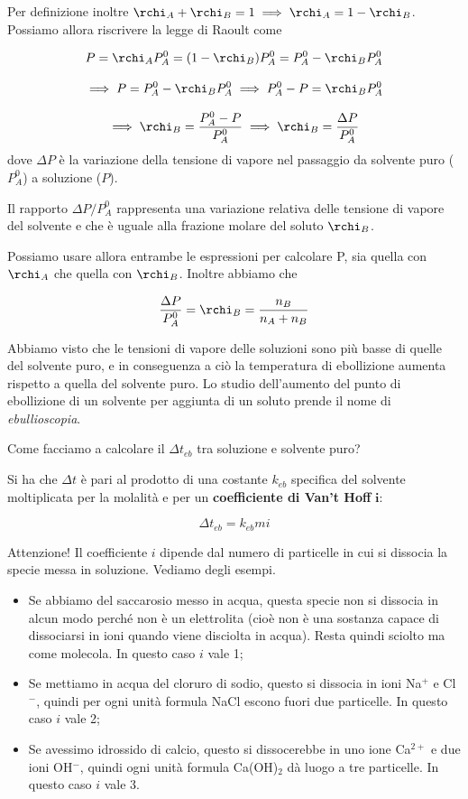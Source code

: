 Per definizione inoltre $\rchi_A + \rchi_B = 1 \implies \rchi_A = 1 - \rchi_B$. Possiamo allora riscrivere la legge di Raoult come 

$$P=\rchi_AP^0_A=(1- \rchi_B)P^0_A=P^0_A - \rchi_BP^0_A$$

$$\implies P=P^0_A - \rchi_BP^0_A \implies P^0_A - P = \rchi_BP^0_A$$

$$\implies \rchi_B=\frac{P^0_A - P}{P^0_A} \implies \rchi_B=\frac{\Delta P}{P^0_A}$$
dove $\Delta P$ è la variazione della tensione di vapore nel passaggio da solvente puro ($P_A^0$) a soluzione ($P$).

Il rapporto $\Delta P/P_A^0$ rappresenta una variazione relativa delle tensione di vapore del solvente e che è uguale alla frazione molare del soluto $\rchi_B$.

Possiamo usare allora entrambe le espressioni per calcolare P, sia quella con $\rchi_A$ che quella con $\rchi_B$. Inoltre abbiamo che

$$\frac{\Delta P}{P_A^0}= \rchi_B = \frac{n_B}{n_A + n_B}$$

Abbiamo visto che le tensioni di vapore delle soluzioni sono più basse di quelle del solvente puro, e in conseguenza a ciò la temperatura di ebollizione aumenta rispetto a quella del solvente puro. Lo studio dell'aumento del punto di ebollizione di un solvente per aggiunta di un soluto prende il nome di \textit{ebullioscopia}.

Come facciamo a calcolare il $\Delta t_{eb}$ tra soluzione e solvente puro?

Si ha che $\Delta t$ è pari al prodotto di una costante $k_{eb}$ specifica del solvente moltiplicata per la molalità e per un \textbf{coefficiente di Van't Hoff} $\boldsymbol{i}$:

$$\Delta t_{eb} = k_{eb} m i$$

Attenzione! Il coefficiente $i$ dipende dal numero di particelle in cui si dissocia la specie messa in soluzione. Vediamo degli esempi.

\begin{itemize}
    \item Se abbiamo del saccarosio messo in acqua, questa specie non si dissocia in alcun modo perché non è un elettrolita (cioè non è una sostanza capace di dissociarsi in ioni quando viene disciolta in acqua). Resta quindi sciolto ma come molecola. In questo caso $i$ vale 1;
    \item Se mettiamo in acqua del cloruro di sodio, questo si dissocia in ioni Na$^+$ e Cl$^-$, quindi per ogni unità formula NaCl escono fuori due particelle. In questo caso $i$ vale 2;
    \item Se avessimo idrossido di calcio, questo si dissocerebbe in uno ione Ca$^{2+}$ e due ioni OH$^-$, quindi ogni unità formula Ca(OH)$_2$ dà luogo a tre particelle. In questo caso $i$ vale 3.
\end{itemize}

